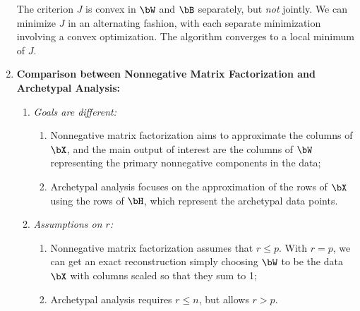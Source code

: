 \documentclass[12pt]{article}
\begin{document}
\begin{enumerate}[label=\textbf{\arabic*.}]
	The criterion $J$ is convex in $\bW$ and $\bB$ separately, but \emph{not} jointly. We can minimize $J$ in an alternating fashion, with each separate minimization involving a convex optimization. The algorithm converges to a local minimum of $J$. 
	
	\item \textbf{Comparison between Nonnegative Matrix Factorization and Archetypal Analysis:}
	\begin{enumerate}
		\item \textit{Goals are different:} 
		\begin{enumerate}
			\item Nonnegative matrix factorization aims to approximate the columns of $\bX$, and the main output of interest are the columns of $\bW$ representing the primary nonnegative components in the data; 
			\item Archetypal analysis focuses on the approximation of the rows of $\bX$ using the rows of $\bH$, which represent the archetypal data points. 
		\end{enumerate}
		
		\item \textit{Assumptions on $r$:} 
		\begin{enumerate}
			\item Nonnegative matrix factorization assumes that $r \le p$. With $r = p$, we can get an exact reconstruction simply choosing $\bW$ to be the data $\bX$ with columns scaled so that they sum to 1; 
			\item Archetypal analysis requires $r \le n$, but allows $r > p$. 
		\end{enumerate}
		
	\end{enumerate}

\end{enumerate}

\printbibliography
\end{document}
